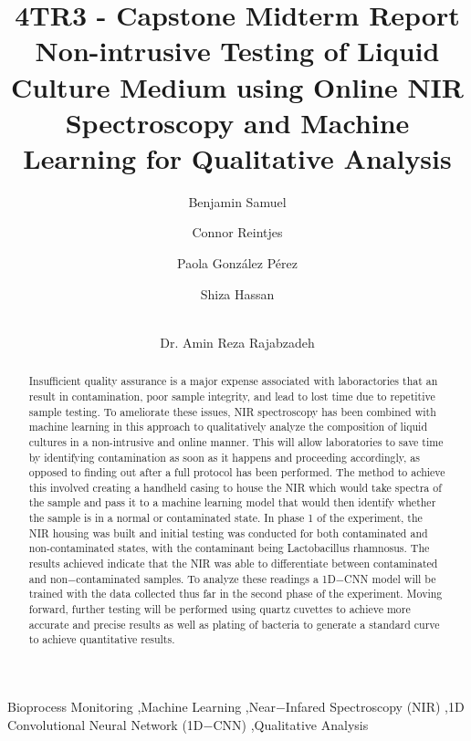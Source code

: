 \documentclass[final, 3p, 11pt]{elsarticle}
\begin{document}
\begin{frontmatter}


\title{4TR3 - Capstone Midterm Report\\}
\title{Non-intrusive Testing of Liquid Culture Medium using Online NIR Spectroscopy and Machine Learning for Qualitative Analysis}

\author[1]{Benjamin Samuel}
\author[1]{Connor Reintjes}
\author[1]{Paola Gonz\'alez P\'erez}
\author[1]{Shiza Hassan}
\author[1]{\\Dr. Amin Reza Rajabzadeh} %



\begin{abstract}
Insufficient quality assurance is a major expense associated with laboractories that an result in contamination, poor sample integrity, and lead to lost time due to repetitive sample testing. To ameliorate these issues, NIR spectroscopy has been combined with machine learning in this approach to qualitatively analyze the composition of liquid cultures in a non-intrusive and online manner. This will allow laboratories to save time by identifying contamination as soon as it happens and proceeding accordingly, as opposed to finding out after a full protocol has been performed. The method to achieve this involved creating a handheld casing to house the NIR which would take spectra of the sample and pass it to a machine learning model that would then identify whether the sample is in a normal or contaminated state. In phase 1 of the experiment, the NIR housing was built and initial testing was conducted for both contaminated and non-contaminated states, with the contaminant being Lactobacillus rhamnosus. The results achieved indicate that the NIR was able to differentiate between contaminated and non$-$contaminated samples. To analyze these readings a 1D$-$CNN model will be trained with the data collected thus far in the second phase of the experiment. Moving forward, further testing will be performed using quartz cuvettes to achieve more accurate and precise results as well as plating of bacteria to generate a standard curve to achieve quantitative results. 

\end{abstract}

\begin{keyword}
Bioprocess Monitoring \sep Machine Learning \sep Near$-$Infared Spectroscopy (NIR) \sep 1D Convolutional Neural Network (1D$-$CNN) \sep Qualitative Analysis
\end{keyword}

\end{frontmatter}
\end{document}
